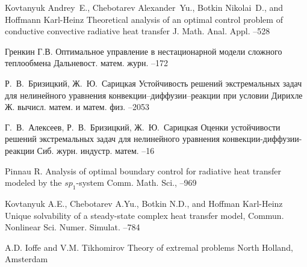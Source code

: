 \begin{thebibliography}{10}
    \by Kovtanyuk Andrey~E., Chebotarev Alexander~Yu., Botkin Nikolai~D., and Hoffmann Karl-Heinz
    \paper Theoretical analysis of an optimal control problem of conductive convective radiative heat transfer
    \jour J. Math. Anal. Appl.
    –528

    \by Гренкин Г.В.
    \paper  Оптимальное управление в нестационарной модели сложного теплообмена
    \jour Дальневост. матем. журн.
    –172

    \by Р.~В.~Бризицкий, Ж.~Ю.~Сарицкая
    \paper Устойчивость решений экстремальных задач для нелинейного уравнения конвекции–диффузии–реакции при условии Дирихле
    \jour Ж. вычисл. матем. и матем. физ.
    --2053

    \by Г.~В.~Алексеев, Р.~В.~Бризицкий, Ж.~Ю.~Сарицкая
    \paper Оценки устойчивости решений экстремальных задач для нелинейного уравнения конвекции-диффузии-реакции
    \jour Сиб. журн. индустр. матем.
    --16

    \by Pinnau R.
    \paper Analysis of optimal boundary control for radiative heat transfer modeled by the $sp_1$-system
    \jour Comm. Math. Sci.,
    –969

    \by Kovtanyuk A.E., Chebotarev A.Yu., Botkin N.D., and Hoffman Karl-Heinz
    \paper Unique solvability of a steady-state complex heat transfer model,
    \jour Commun. Nonlinear Sci. Numer. Simulat.
    –784

    \by A.D. Ioffe and V.M. Tikhomirov
    \book Theory of extremal problems
    \publaddr North Holland, Amsterdam

\end{thebibliography}

